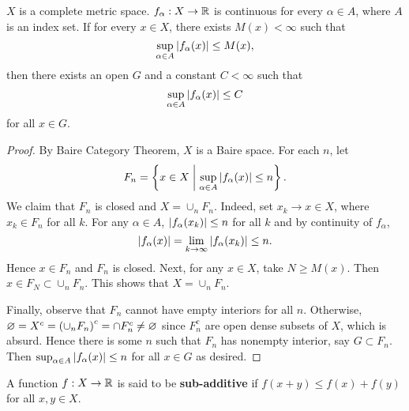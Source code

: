 \begin{theorem}\label{thm:ubp1}
    $X$ is a complete metric space. $f_\alpha:X\to\mathbb{R}$ is continuous 
    for every $\alpha\in A$, where $A$ is an index set. If for every 
    $x\in X$, there exists $M(x)<\infty$ such that 
    \begin{equation*}
        \sup_{\alpha\in A}\left\lvert {f_\alpha(x)} \right\rvert\leq M(x),
    \end{equation*}
    then there exists an open $G$ and a constant $C<\infty$ such that 
    \begin{equation*}
        \sup_{\alpha\in A}\left\lvert {f_\alpha(x)} \right\rvert\leq C
    \end{equation*}
    for all $x\in G$.
\end{theorem}
\begin{proof}
    By Baire Category Theorem, $X$ is a Baire space. For each $n$, 
    let 
    \begin{equation*}
        F_n = \left\{ x\in X \;\middle\vert\; \sup_{\alpha\in A}\left\lvert {f_\alpha(x)} \right\rvert\leq n \right\}.
    \end{equation*}
    We claim that $F_n$ is closed and $X = \cup_n F_n$. Indeed, 
    set $x_k\to x\in X$, where $x_k\in F_n$ for all $k$. For any 
    $\alpha\in A$, $\left\lvert {f_\alpha(x_k)} \right\rvert\leq n$ for all $k$ and 
    by continuity of $f_\alpha$, 
    \begin{equation*}
        \left\lvert {f_\alpha(x)} \right\rvert = \lim_{k\to\infty}\left\lvert {f_\alpha(x_k)} \right\rvert\leq n.
    \end{equation*}
    Hence $x\in F_n$ and $F_n$ is closed. Next, for any $x\in X$, 
    take $N \geq M(x)$. Then $x\in F_N\subset\cup_n F_n$. This 
    shows that $X = \cup_n F_n$. 

    Finally, observe that $F_n$ cannot have empty interiors for 
    all $n$. Otherwise, $\varnothing = X^c = \pth{\cup_n F_n}^c
    = \cap F_n^c \neq \varnothing$ since $F_n^c$ are open dense 
    subsets of $X$, which is absurd. Hence there is some $n$ such 
    that $F_n$ has nonempty interior, say $G\subset F_n$. Then 
    $\sup_{\alpha\in A}\left\lvert {f_\alpha(x)} \right\rvert\leq n$ for all $x\in G$ 
    as desired.
\end{proof}

\begin{definition}
    A function $f:X\to\mathbb{R}$ is said to be \textbf{sub-additive} if 
    $f(x+y)\leq f(x)+f(y)$ for all $x,y\in X$.
\end{definition}

